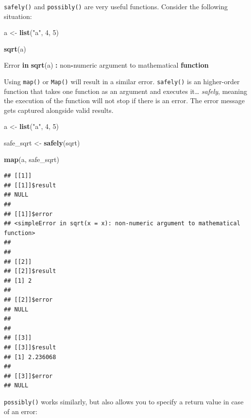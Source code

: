 \documentclass[]{gitbook}
\newenvironment{Shaded}{\begin{snugshade}}{\end{snugshade}}
\newcommand{\ControlFlowTok}[1]{\textcolor[rgb]{0.13,0.29,0.53}{\textbf{#1}}}
\newcommand{\DecValTok}[1]{\textcolor[rgb]{0.00,0.00,0.81}{#1}}
\newcommand{\KeywordTok}[1]{\textcolor[rgb]{0.13,0.29,0.53}{\textbf{#1}}}
\newcommand{\NormalTok}[1]{#1}
\newcommand{\OperatorTok}[1]{\textcolor[rgb]{0.81,0.36,0.00}{\textbf{#1}}}
\newcommand{\StringTok}[1]{\textcolor[rgb]{0.31,0.60,0.02}{#1}}
\theoremstyle{definition}
\theoremstyle{definition}
\theoremstyle{definition}
\theoremstyle{remark}
\begin{document}
\texttt{safely()} and \texttt{possibly()} are very useful functions.
Consider the following situation:

\begin{Shaded}
\begin{Highlighting}[]
\NormalTok{a <-}\StringTok{ }\KeywordTok{list}\NormalTok{(}\StringTok{"a"}\NormalTok{, }\DecValTok{4}\NormalTok{, }\DecValTok{5}\NormalTok{)}

\KeywordTok{sqrt}\NormalTok{(a)}
\end{Highlighting}
\end{Shaded}

\begin{Shaded}
\begin{Highlighting}[]
\NormalTok{Error }\ControlFlowTok{in} \KeywordTok{sqrt}\NormalTok{(a) }\OperatorTok{:}\StringTok{ }\NormalTok{non}\OperatorTok{-}\NormalTok{numeric argument to mathematical }\ControlFlowTok{function}
\end{Highlighting}
\end{Shaded}

Using \texttt{map()} or \texttt{Map()} will result in a similar error.
\texttt{safely()} is an higher-order function that takes one function as
an argument and executes it\ldots{} \emph{safely}, meaning the execution
of the function will not stop if there is an error. The error message
gets captured alongside valid results.

\begin{Shaded}
\begin{Highlighting}[]
\NormalTok{a <-}\StringTok{ }\KeywordTok{list}\NormalTok{(}\StringTok{"a"}\NormalTok{, }\DecValTok{4}\NormalTok{, }\DecValTok{5}\NormalTok{)}

\NormalTok{safe_sqrt <-}\StringTok{ }\KeywordTok{safely}\NormalTok{(sqrt)}

\KeywordTok{map}\NormalTok{(a, safe_sqrt)}
\end{Highlighting}
\end{Shaded}

\begin{verbatim}
## [[1]]
## [[1]]$result
## NULL
## 
## [[1]]$error
## <simpleError in sqrt(x = x): non-numeric argument to mathematical function>
## 
## 
## [[2]]
## [[2]]$result
## [1] 2
## 
## [[2]]$error
## NULL
## 
## 
## [[3]]
## [[3]]$result
## [1] 2.236068
## 
## [[3]]$error
## NULL
\end{verbatim}

\texttt{possibly()} works similarly, but also allows you to specify a
return value in case of an error:
\end{document}
